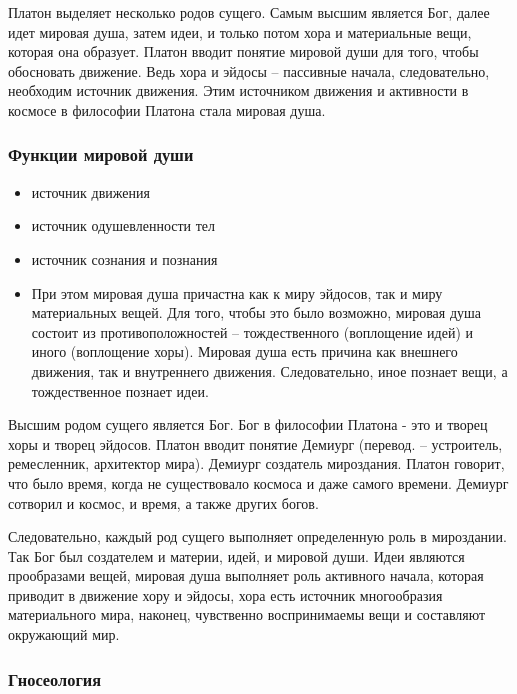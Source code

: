 \documentclass[
]{article}
\providecommand{\tightlist}{%
  \setlength{\itemsep}{0pt}\setlength{\parskip}{0pt}}
\begin{document}
Платон выделяет несколько родов сущего. Самым высшим является Бог, далее
идет мировая душа, затем идеи, и только потом хора и материальные вещи,
которая она образует. Платон вводит понятие мировой души для того, чтобы
обосновать движение. Ведь хора и эйдосы -- пассивные начала,
следовательно, необходим источник движения. Этим источником движения и
активности в космосе в философии Платона стала мировая душа.

\hypertarget{ux444ux443ux43dux43aux446ux438ux438-ux43cux438ux440ux43eux432ux43eux439-ux434ux443ux448ux438}{%
\subsubsection{Функции мировой
души}\label{ux444ux443ux43dux43aux446ux438ux438-ux43cux438ux440ux43eux432ux43eux439-ux434ux443ux448ux438}}

\begin{itemize}
\tightlist
\item
  источник движения
\item
  источник одушевленности тел
\item
  источник сознания и познания
\item
  При этом мировая душа причастна как к миру эйдосов, так и миру
  материальных вещей. Для того, чтобы это было возможно, мировая душа
  состоит из противоположностей -- тождественного (воплощение идей) и
  иного (воплощение хоры). Мировая душа есть причина как внешнего
  движения, так и внутреннего движения. Следовательно, иное познает
  вещи, а тождественное познает идеи.
\end{itemize}

Высшим родом сущего является Бог. Бог в философии Платона - это и творец
хоры и творец эйдосов. Платон вводит понятие Демиург (перевод. --
устроитель, ремесленник, архитектор мира). Демиург создатель мироздания.
Платон говорит, что было время, когда не существовало космоса и даже
самого времени. Демиург сотворил и космос, и время, а также других
богов.

Следовательно, каждый род сущего выполняет определенную роль в
мироздании. Так Бог был создателем и материи, идей, и мировой души. Идеи
являются прообразами вещей, мировая душа выполняет роль активного
начала, которая приводит в движение хору и эйдосы, хора есть источник
многообразия материального мира, наконец, чувственно воспринимаемы вещи
и составляют окружающий мир.

\hypertarget{ux433ux43dux43eux441ux435ux43eux43bux43eux433ux438ux44f}{%
\subsubsection{Гносеология}\label{ux433ux43dux43eux441ux435ux43eux43bux43eux433ux438ux44f}}
\end{document}
